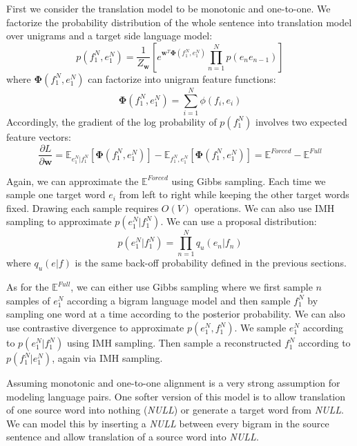 First we consider the translation model to be monotonic and one-to-one. We factorize the probability distribution of the whole sentence into translation model over unigrams
and a target side language model:
\begin{equation}
p(f_1^N, e_1^N) = \frac{1}{Z_{\mathbf{w}}}  [e^{\mathbf{w}^T\mathbf{\Phi}(f_1^N, e_1^N)}  \prod_{n=1}^N p(e_ne_{n-1})]
\end{equation}
where $\mathbf{\Phi}(f_1^N, e_1^N)$ can factorize into unigram feature functions:
\begin{equation}
\mathbf{\Phi}(f_1^N, e_1^N) = \sum_{i=1}^N \phi(f_i, e_i)
\end{equation}
Accordingly, the gradient of the log probability of $p(f_1^N)$ involves two expected feature vectors:
\begin{equation}
\frac{\partial L} { \partial \mathbf{w}} = \mathbb{E}_{e_1^N|f_1^N} \left[ \mathbf{\Phi}(f_1^N, e_1^N) \right] - 
   \mathbb{E}_{f_1^N,e_1^N} \left[ \mathbf{\Phi}(f_1^N, e_1^N) \right]=  \mathbb{E}^{Forced} - \mathbb{E}^{Full}
\end{equation}


Again, we can approximate the $\mathbb{E}^{Forced}$ using Gibbs sampling. Each time we sample one target word $e_i$ from left
to right while keeping the other target words fixed. Drawing each sample requires $O(V)$ operations.
We can also use IMH sampling to approximate $p(e_1^N|f_1^N)$. We can use a proposal distribution:
$$p(e_1^N|f_1^N) = \prod_{n=1}^{N} q_u (e_n|f_n)$$
where $q_u(e|f)$ is the same back-off probability defined in the previous sections.


As for the $\mathbb{E}^{Full}$, we can either use Gibbs sampling where we first sample $n$ samples of $e_1^N$ according a bigram language model and then sample $f_1^N$ by sampling one word at a time according to the posterior probability. We can also use contrastive divergence to approximate $p(e_1^N, f_1^N)$. We sample $e_1^N$ according to $p(e_1^N|f_1^N)$ using IMH sampling. Then sample a reconstructed $f_1^N$ according to $p(f_1^N| e_1^N)$, again via IMH sampling.


Assuming monotonic and one-to-one alignment is a very strong assumption for modeling language pairs. One softer version of this model is 
to allow translation of one source word into nothing (\textit{NULL}) or generate a target word from \textit{NULL}. We can model this by inserting
a \textit{NULL} between every bigram in the source sentence and allow translation of
a source word into \textit{NULL}.


